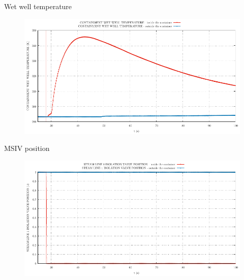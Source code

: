 \begin{frame}{Wet well temperature}
	\begin{figure}
		\centering
		\includegraphics[width=\textwidth]{./graphs/CONTAINMENT WET WELL TEMPERATURE_comp.pdf}
		
	\end{figure}
	
\end{frame}


\begin{frame}{MSIV position}
	\begin{figure}
		\centering
		\includegraphics[width=\textwidth]{./graphs/STEAM LINE 1 ISOLATION VALVE POSITION_comp.pdf}
		
	\end{figure}
	
\end{frame}

